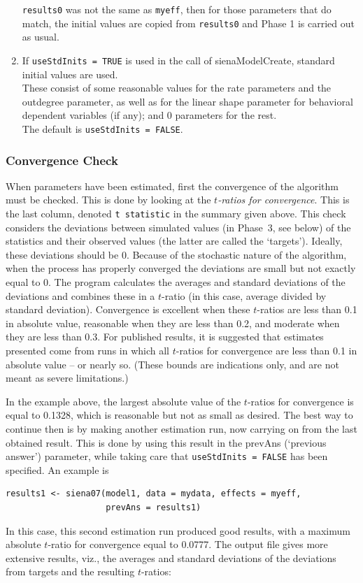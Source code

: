 \documentclass[a4paper,fleqn,11pt]{article}
\newcommand{\+}{\, + \,}
\begin{document}
\begin{enumerate}
      \texttt{results0} was not the same as \texttt{myeff}, then for those
      parameters that do match, the initial values are copied
      from \texttt{results0} and Phase 1 is carried out as usual.
\item If \texttt{useStdInits = TRUE} is used in the call of
      \textsf{sienaModelCreate}, standard initial values are used.\\
      These consist of some reasonable values for the rate parameters and the
      outdegree parameter, as well as for the linear shape parameter
      for behavioral dependent variables (if any);
      and 0 parameters for the rest.\\
      The default is  \texttt{useStdInits = FALSE}.
\end{enumerate}

\subsubsection{Convergence Check}
\label{S_ccheck}

When parameters have been estimated, first the
\hypertarget{T_convergence}{convergence} of the
algorithm must be checked. This is done by looking at the
\emph{$t$-ratios for convergence}. This is the last column, denoted
\texttt{t statistic} in the summary given above.
This check
considers the deviations between simulated values
(in Phase~3, see below) of the
statistics and their observed values (the latter are called the
`targets'). Ideally, these deviations should be 0. Because of the
stochastic nature of the algorithm, when the process has properly
converged the deviations are small but not exactly equal to 0.
The program calculates the averages and standard deviations of the
deviations and combines these in a $t$-ratio (in this case,
average divided by standard deviation).
Convergence is excellent when these $t$-ratios are less than 0.1
in absolute value, reasonable when they are less than 0.2, and
moderate when they are less than 0.3.
For published results, it is suggested that estimates presented come from runs
in which all $t$-ratios for convergence are less than 0.1 in absolute value
-- or nearly so.
(These bounds are indications only, and
are not meant as severe limitations.)

In the example above, the largest absolute value of the $t$-ratios for convergence
is equal to 0.1328, which is reasonable but not as small as desired.
The best way to continue then is by making another estimation run,
now carrying on from the last obtained result. This is done by
using this result in the \textsf{prevAns} (`previous answer')
parameter, while taking care that  \texttt{useStdInits = FALSE}
has been specified. An example is
\begin{verbatim}
results1 <- siena07(model1, data = mydata, effects = myeff,
                    prevAns = results1)
\end{verbatim}
In this case, this second estimation run produced good results, with a
maximum absolute   $t$-ratio for convergence equal to 0.0777.
The output file gives more extensive results, viz.,
 the averages and standard deviations of the
deviations from targets and the resulting $t$-ratios:
\end{document}
